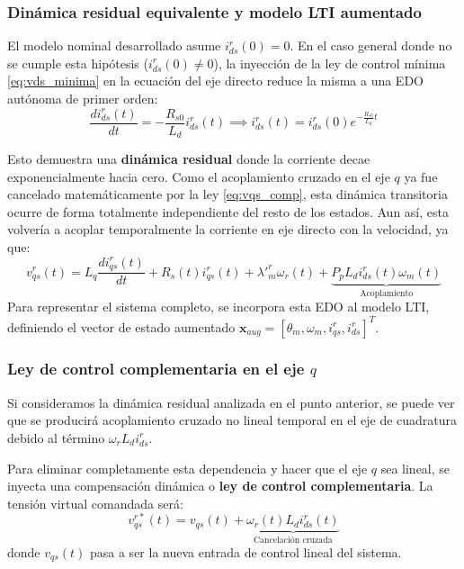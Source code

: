 \documentclass[12pt, a4paper,journal, onecolumn, compsoc]{IEEEtran}
\begin{document}
\subsubsection{Dinámica residual equivalente y modelo LTI aumentado}
El modelo nominal desarrollado asume $i_{ds}^r(0) = 0$. En el caso general donde no se cumple esta hipótesis ($i_{ds}^r(0) \neq 0$), la inyección de la ley de control mínima \eqref{eq:vds_minima} en la ecuación del eje directo reduce la misma a una EDO autónoma de primer orden:
\begin{equation}
    \frac{di_{ds}^r(t)}{dt} = -\frac{R_{s0}}{L_d} i_{ds}^r(t) \implies i_{ds}^r(t) = i_{ds}^r(0) e^{-\frac{R_{s0}}{L_d} t}
\end{equation}

Esto demuestra una \textbf{dinámica residual} donde la corriente decae exponencialmente hacia cero. Como el acoplamiento cruzado en el eje $q$ ya fue cancelado matemáticamente por la ley \eqref{eq:vqs_comp}, esta dinámica transitoria ocurre de forma totalmente independiente del resto de los estados. 
Aun así, esta volvería a acoplar temporalmente la corriente en eje directo con la velocidad, ya que:
\begin{equation*}
    v_{qs}^r(t) = L_q \dfrac{di_{qs}^r(t)}{dt} + R_s(t)i_{qs}^r(t)+\lambda'^r_m\omega_r(t)+  \underbrace{P_pL_di_{ds}^r(t)\omega_m(t)}_{\text{Acoplamiento}}
\end{equation*}
Para representar el sistema completo, se incorpora esta EDO al modelo LTI, definiendo el vector de estado aumentado $\mathbf{x}_{aug} = [\theta_m, \omega_m, i_{qs}^r, i_{ds}^r]^T$. 

\subsubsection{Ley de control complementaria en el eje $q$}
Si consideramos la dinámica residual analizada en el punto anterior, se puede ver que se producirá acoplamiento cruzado no lineal temporal en el eje de cuadratura debido al término $\omega_r L_d i_{ds}^r$. 

Para eliminar completamente esta dependencia y hacer que el eje $q$ sea lineal, se inyecta una compensación dinámica o \textbf{ley de control complementaria}. La tensión virtual comandada será:
\begin{equation} \label{eq:vqs_comp}
    v_{qs}^{r*}(t) = v_{qs}(t) + \underbrace{\omega_r(t) L_d i_{ds}^r(t)}_{\text{Cancelación cruzada}}
\end{equation}
donde $v_{qs}(t)$ pasa a ser la nueva entrada de control lineal del sistema.
\end{document}
